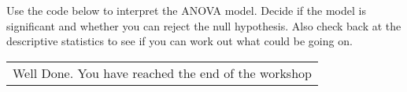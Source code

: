\documentclass[
]{book}
\newenvironment{Shaded}{\begin{snugshade}}{\end{snugshade}}
\newcommand{\NormalTok}[1]{#1}
\newcommand{\SpecialCharTok}[1]{\textcolor[rgb]{0.81,0.36,0.00}{\textbf{#1}}}
\begin{document}
Use the code below to interpret the ANOVA model. Decide if the model is significant and whether you can reject the null hypothesis. Also check back at the descriptive statistics to see if you can work out what could be going on.

\begin{Shaded}
\end{Shaded}

\begin{longtable}[]{@{}l@{}}
\toprule\noalign{}
\endhead
\bottomrule\noalign{}
\endlastfoot
Well Done. You have reached the end of the workshop \\
\end{longtable}


\end{document}
